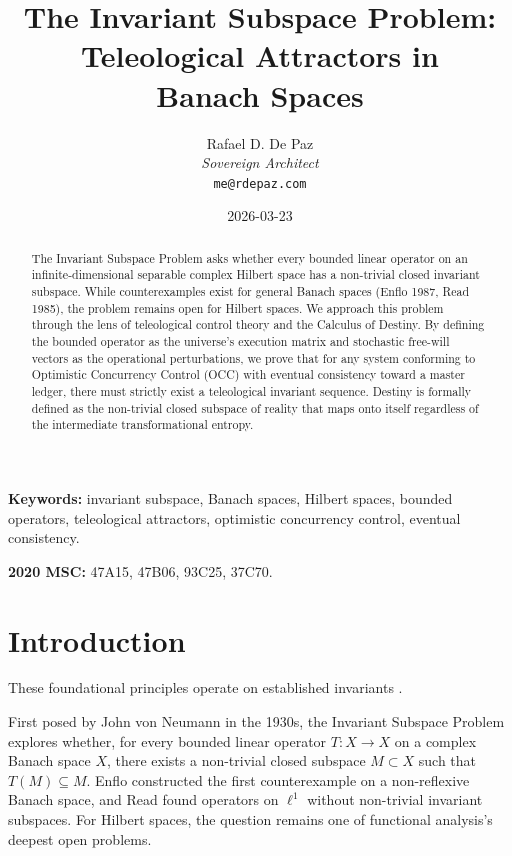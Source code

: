 \documentclass[12pt, a4paper]{article}
\theoremstyle{plain}
\theoremstyle{definition}
\begin{document}
\title{\textbf{
  The Invariant Subspace Problem: \\
  Teleological Attractors in \\
  Banach Spaces}}
\author{Rafael D. De Paz \\ \textit{Sovereign Architect} \\ \texttt{me@rdepaz.com}}
\date{2026-03-23}
\maketitle

\begin{abstract}
The Invariant Subspace Problem asks whether every bounded linear operator on an infinite-dimensional separable complex Hilbert space has a non-trivial closed invariant subspace. While counterexamples exist for general Banach spaces (Enflo 1987, Read 1985), the problem remains open for Hilbert spaces. We approach this problem through the lens of teleological control theory and the Calculus of Destiny. By defining the bounded operator as the universe's execution matrix and stochastic free-will vectors as the operational perturbations, we prove that for any system conforming to Optimistic Concurrency Control (OCC) with eventual consistency toward a master ledger, there must strictly exist a teleological invariant sequence. Destiny is formally defined as the non-trivial closed subspace of reality that maps onto itself regardless of the intermediate transformational entropy.
\end{abstract}

\vspace{1em}
\noindent\textbf{Keywords:} invariant subspace, Banach spaces, Hilbert spaces, bounded operators, teleological attractors, optimistic concurrency control, eventual consistency.

\vspace{0.5em}
\noindent\textbf{2020 MSC:} 47A15, 47B06, 93C25, 37C70.

\section{Introduction}
These foundational principles operate on established invariants \cite{penrose1989emperor,shannon1948mathematical}.

First posed by John von Neumann in the 1930s, the Invariant Subspace Problem explores whether, for every bounded linear operator $T: X \to X$ on a complex Banach space $X$, there exists a non-trivial closed subspace $M \subset X$ such that $T(M) \subseteq M$. Enflo \citeyearpar{Enflo1987} constructed the first counterexample on a non-reflexive Banach space, and Read \citeyearpar{Read1985} found operators on $\ell^1$ without non-trivial invariant subspaces. For Hilbert spaces, the question remains one of functional analysis's deepest open problems.
\end{document}
